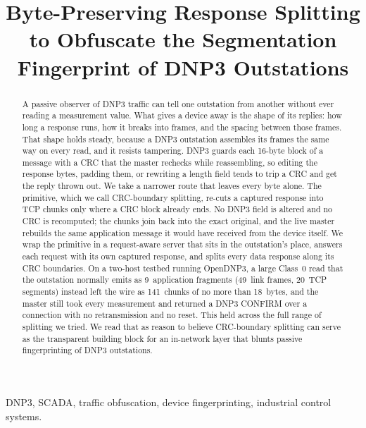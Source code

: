\documentclass[conference]{IEEEtran}
\begin{document}
\title{Byte-Preserving Response Splitting to Obfuscate the Segmentation
Fingerprint of DNP3 Outstations}

\author{
}

\maketitle

\begin{abstract}
A passive observer of DNP3 traffic can tell one outstation from another without
ever reading a measurement value. What gives a device away is the shape of its
replies: how long a response runs, how it breaks into frames, and the spacing
between those frames. That shape holds steady, because a DNP3 outstation
assembles its frames the same way on every read, and it resists tampering. DNP3
guards each 16-byte block of a message with a CRC that the master rechecks while
reassembling, so editing the response bytes, padding them, or rewriting a length
field tends to trip a CRC and get the reply thrown out. We take a narrower route
that leaves every byte alone. The primitive, which we call CRC-boundary
splitting, re-cuts a captured response into TCP chunks only where a CRC block
already ends. No DNP3 field is altered and no CRC is recomputed; the chunks join
back into the exact original, and the live master rebuilds the same application
message it would have received from the device itself. We wrap the primitive in a
request-aware server that sits in the outstation's place, answers each request
with its own captured response, and splits every data response along its CRC
boundaries. On a two-host testbed running OpenDNP3, a large Class~0 read that the
outstation normally emits as 9~application fragments (49~link frames, 20~TCP
segments) instead left the wire as 141~chunks of no more than 18~bytes, and the
master still took every measurement and returned a DNP3 CONFIRM over a connection
with no retransmission and no reset. This held across the full range of splitting
we tried. We read that as reason to believe CRC-boundary splitting can serve as
the transparent building block for an in-network layer that blunts passive
fingerprinting of DNP3 outstations.
\end{abstract}

\begin{IEEEkeywords}
DNP3, SCADA, traffic obfuscation, device fingerprinting, industrial control
systems.
\end{IEEEkeywords}
\end{document}
